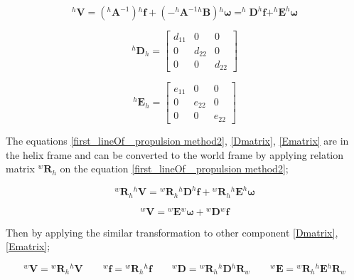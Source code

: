 \documentclass[12pt,a4paper,titlepage]{report}
\begin{document}
\begin{equation}
^{h}\bm{V} = (^{h}\bm{A} ^{-1}){^{h}\bm{f}} + (-^{h}\bm{A} ^{-1} {^{h}\bm{B}}){^{h}\bm{\omega}} = 
^{h}\bm{D} ^{h}\bm{f} + ^{h}\bm{E} ^{h}\bm{\omega}
\label{first_lineOf_ propulsion method2}  
\end{equation}


\begin{equation}
 ^{h}\bm{D}_h = \begin{bmatrix}
       d_{11}  & 0 		 & 0           \\[0.3em]
       0		 & d_{22}           & 0\\[0.3em]
       0           	& 0 		& d_{22}
     \end{bmatrix}
\label{Dmatrix}
\end{equation}




\begin{equation}
 ^{h}\bm{E}_h = \begin{bmatrix}
       e_{11}  & 0 		 & 0           \\[0.3em]
       0		 & e_{22}           & 0\\[0.3em]
       0           	& 0 		& e_{22}
     \end{bmatrix}
\label{Ematrix}
\end{equation}

The equations \ref{first_lineOf_ propulsion method2}, \ref{Dmatrix}, \ref{Ematrix} are in the helix frame and 
can be converted to the world frame by applying relation matrix $^{w}\bm{R}_h$ on the equation
\ref{first_lineOf_ propulsion method2};


\begin{equation}
{^{w}\bm{R}_h}{^{h}\bm{V} } = {^{w}\bm{R}_h}{ ^{h}\bm{D} ^{h}\bm{f}} + {^{w}\bm{R}_h}{^{h}\bm{E} ^{h}\bm{\omega}}
\label{first_lineOf_ propulsion method3}  
\end{equation}



\begin{equation}
^{w}\bm{V}  ={^{w}\bm{E}} {^{w}\bm{\omega}} + {^{w}\bm{D}} {^{w}\bm{f}}  
\label{first_lineOf_ propulsion method4}  
\end{equation}

Then by applying the similar transformation to other component \ref{Dmatrix}, \ref{Ematrix};

\begin{equation}
^{w}\bm{V}  = {^{w}\bm{R}_h}{^{h}\bm{V}}  \qquad  ^{w}\bm{f}  = {^{w}\bm{R}_h}{^{h}\bm{f}}
\qquad  ^{w}\bm{D}  = {^{w}\bm{R}_h}{^{h}\bm{D}} {^{h}\bm{R}_w}
\qquad  ^{w}\bm{E}  = {^{w}\bm{R}_h}{^{h}\bm{E}} {^{h}\bm{R}_w}
\label{first_lineOf_ propulsion method5}  
\end{equation}
\end{document}
